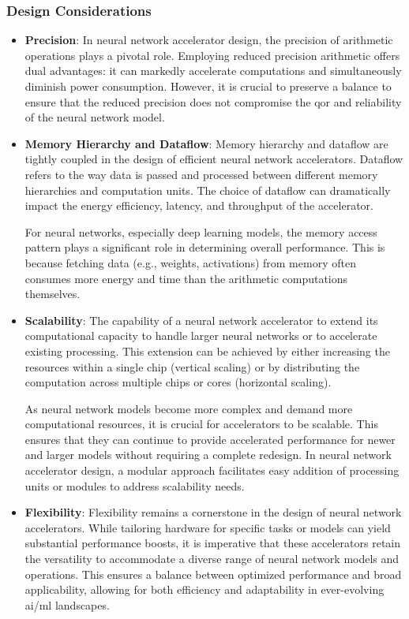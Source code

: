 \subsubsection{Design Considerations}
\begin{itemize}
	\item \textbf{Precision}: In neural network accelerator design, the precision of arithmetic operations plays a pivotal role. Employing reduced precision arithmetic offers dual advantages: it can markedly accelerate computations and simultaneously diminish power consumption. However, it is crucial to preserve a balance to ensure that the reduced precision does not compromise the \gls{qor} and reliability of the neural network model.
	
	\item \textbf{Memory Hierarchy and Dataflow}: Memory hierarchy and dataflow are tightly coupled in the design of efficient neural network accelerators. Dataflow refers to the way data is passed and processed between different memory hierarchies and computation units. The choice of dataflow can dramatically impact the energy efficiency, latency, and throughput of the accelerator.
	
	For neural networks, especially deep learning models, the memory access pattern plays a significant role in determining overall performance. This is because fetching data (e.g., weights, activations) from memory often consumes more energy and time than the arithmetic computations themselves.
	\item \textbf{Scalability}: The capability of a neural network accelerator to extend its computational capacity to handle larger neural networks or to accelerate existing processing. This extension can be achieved by either increasing the resources within a single chip (vertical scaling) or by distributing the computation across multiple chips or cores (horizontal scaling).
	
	As neural network models become more complex and demand more computational resources, it is crucial for accelerators to be scalable. This ensures that they can continue to provide accelerated performance for newer and larger models without requiring a complete redesign.
	In neural network accelerator design, a modular approach facilitates easy addition of processing units or modules to address scalability needs.
	\item \textbf{Flexibility}: Flexibility remains a cornerstone in the design of neural network accelerators. While tailoring hardware for specific tasks or models can yield substantial performance boosts, it is imperative that these accelerators retain the versatility to accommodate a diverse range of neural network models and operations. This ensures a balance between optimized performance and broad applicability, allowing for both efficiency and adaptability in ever-evolving \gls{ai}/\gls{ml} landscapes.
	
\end{itemize}

